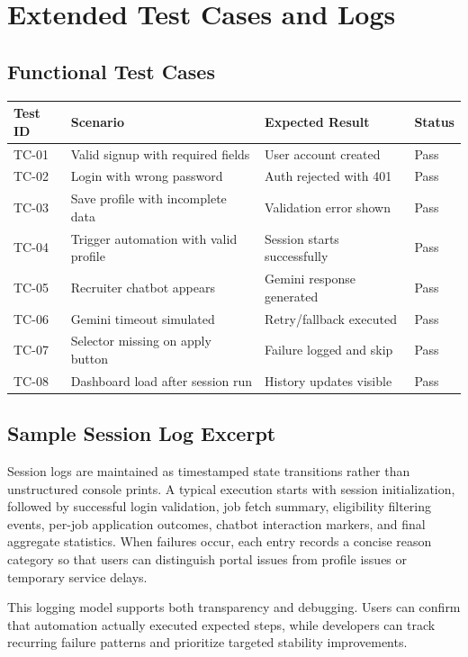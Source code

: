 \documentclass[12pt,a4paper,oneside]{report}
\begin{document}
\chapter{Extended Test Cases and Logs}
\section{Functional Test Cases}
\begin{longtable}{p{}p{}p{}p{}}
\toprule
Test ID & Scenario & Expected Result & Status \\
\midrule
TC-01 & Valid signup with required fields & User account created & Pass \\
TC-02 & Login with wrong password & Auth rejected with 401 & Pass \\
TC-03 & Save profile with incomplete data & Validation error shown & Pass \\
TC-04 & Trigger automation with valid profile & Session starts successfully & Pass \\
TC-05 & Recruiter chatbot appears & Gemini response generated & Pass \\
TC-06 & Gemini timeout simulated & Retry/fallback executed & Pass \\
TC-07 & Selector missing on apply button & Failure logged and skip & Pass \\
TC-08 & Dashboard load after session run & History updates visible & Pass \\
\bottomrule
\end{longtable}

\section{Sample Session Log Excerpt}
Session logs are maintained as timestamped state transitions rather than unstructured console prints. A typical execution starts with session initialization, followed by successful login validation, job fetch summary, eligibility filtering events, per-job application outcomes, chatbot interaction markers, and final aggregate statistics. When failures occur, each entry records a concise reason category so that users can distinguish portal issues from profile issues or temporary service delays.

This logging model supports both transparency and debugging. Users can confirm that automation actually executed expected steps, while developers can track recurring failure patterns and prioritize targeted stability improvements.
\end{document}
